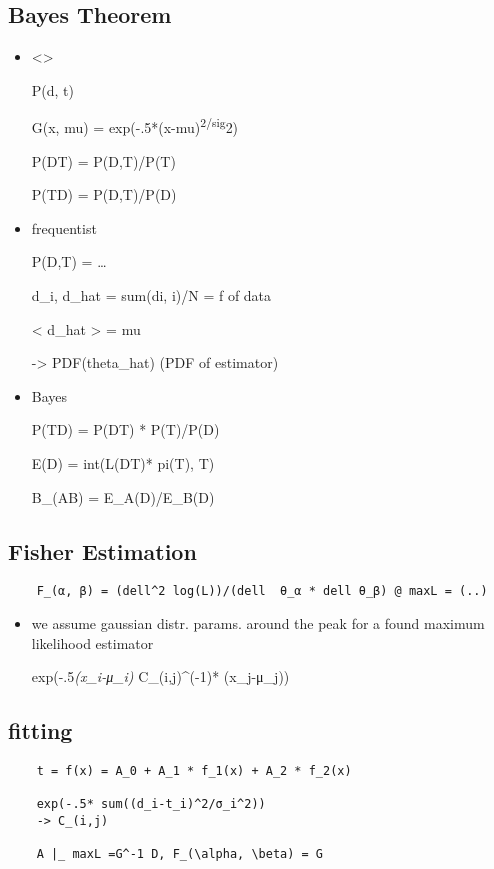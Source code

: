 \documentclass[]{scrartcl}
\begin{document}
    \subsection{Bayes Theorem}\label{bayes-theorem}

    \begin{itemize}
    \item
      \textless{}\textgreater{}

      P(d, t)

      G(x, mu) = exp(-.5*(x-mu)\textsuperscript{2/sig}2)

      P(D\textbar{}T) = P(D,T)/P(T)

      P(T\textbar{}D) = P(D,T)/P(D)
    \item
      frequentist

      P(D,T) = \ldots{}

      d\_i, d\_hat = sum(di, i)/N = f of data

      \textless{} d\_hat \textgreater{} = mu

      -\textgreater{} PDF(theta\_hat) (PDF of estimator)
    \item
      Bayes

      P(T\textbar{}D) = P(D\textbar{}T) * P(T)/P(D)

      E(D) = int(L(D\textbar{}T)* pi(T), T)

      B\_(AB) = E\_A(D)/E\_B(D)
    \end{itemize}

    \subsection{Fisher Estimation}\label{fisher-estimation}

    \begin{verbatim}
    F_(α, β) = (dell^2 log(L))/(dell  θ_α * dell θ_β) @ maxL = (..)
    \end{verbatim}

    \begin{itemize}
    \item
      we assume gaussian distr. params. around the peak for a found maximum
      likelihood estimator

      exp(-.5\emph{(x\_i-μ\_i)} C\_(i,j)\^{}(-1)* (x\_j-μ\_j))
    \end{itemize}

    \subsection{fitting}\label{fitting}

    \begin{verbatim}
    t = f(x) = A_0 + A_1 * f_1(x) + A_2 * f_2(x)

    exp(-.5* sum((d_i-t_i)^2/σ_i^2))
    -> C_(i,j)

    A |_ maxL =G^-1 D, F_(\alpha, \beta) = G
    \end{verbatim}
\end{document}
